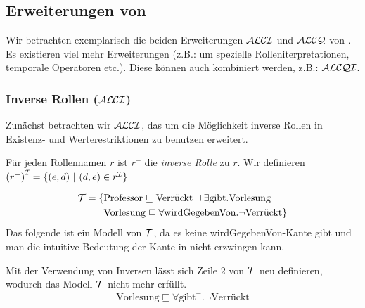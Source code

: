 \subsection{Erweiterungen von \texorpdfstring{\ALC}{ALC}}\label{erweiterungen-von-alc}

Wir betrachten exemplarisch die beiden Erweiterungen $\mathcal{A}\mathcal{L}\mathcal{C}\mathcal{I}$ und $\mathcal{A}\mathcal{L}\mathcal{C}\mathcal{Q}$ von \ALC. Es existieren viel mehr Erweiterungen (z.B.: um spezielle Rolleniterpretationen, temporale Operatoren etc.). Diese können auch kombiniert werden, z.B.: $\mathcal{A}\mathcal{L}\mathcal{C}\mathcal{Q}\mathcal{I}$.

\subsubsection{Inverse Rollen (\texorpdfstring{$\mathcal{A}\mathcal{L}\mathcal{C}\mathcal{I}$}{ALCI})}\label{inverse-rollen-alci}

Zunächst betrachten wir $\mathcal{A}\mathcal{L}\mathcal{C}\mathcal{I}$, das \ALC um die Möglichkeit inverse Rollen in Existenz- und Werterestriktionen zu benutzen erweitert.

\begin{definition}
Für jeden Rollennamen $r$ ist $r^{-}$ die \emph{inverse
Rolle} zu $r$. Wir definieren
$\left( r^{-} \right)^\MI = \left\{ \left( e,d \right)\  \right|\ \left( d,e \right) \in r^\MI\}$
\end{definition}

\begin{tafel}
    \begin{align*}
        \mathcal{T} = \{& \text{Professor} \sqsubseteq \text{Verrückt} \sqcap \exists  \text{gibt}.\text{Vorlesung}\\
                & \text{Vorlesung} \sqsubseteq \forall \text{wirdGegebenVon}.\neg\text{Verrückt}\}
    \end{align*}
    Das folgende ist ein Modell von $\mathcal{T}$, da es keine wirdGegebenVon-Kante gibt und man die intuitive Bedeutung der Kante in \ALC nicht erzwingen kann.
    \begin{center}
    \end{center}
    Mit der Verwendung von Inversen lässt sich Zeile 2 von $\mathcal{T}$ neu definieren, wodurch das Modell $\mathcal{T}$ nicht mehr erfüllt.
    \begin{align*}
        \text{Vorlesung} \sqsubseteq \forall \text{gibt}^-.\neg\text{Verrückt}
    \end{align*}
\end{tafel}

